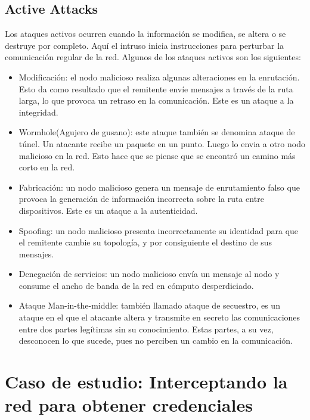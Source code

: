 \subsection{Active Attacks}
Los ataques activos ocurren cuando la información se modifica, se altera o 
se destruye por completo. Aquí el intruso inicia instrucciones para 
perturbar la comunicación regular de la red. Algunos de los ataques 
activos son los  siguientes:
\begin{itemize}
    \setlength\itemsep{-0.6em}
    \item Modificación: el nodo malicioso realiza algunas alteraciones en la 
    enrutación. Esto da como resultado que el remitente envíe mensajes a 
    través de la ruta larga, lo que provoca un retraso en la comunicación. 
    Este es un ataque a la integridad.
    \item Wormhole(Agujero de gusano): este ataque también se denomina ataque 
    de túnel. Un atacante recibe un paquete en un punto. Luego lo envia 
    a otro nodo malicioso en la red. Esto hace que se piense que se encontró 
    un camino más corto en la red.
    \item Fabricación: un nodo malicioso genera un mensaje de enrutamiento 
    falso que provoca la generación de información incorrecta sobre la ruta 
    entre dispositivos. Este es un ataque a la autenticidad.
    \item Spoofing: un nodo malicioso presenta incorrectamente su identidad 
    para que el remitente cambie su topología, y por consiguiente el 
    destino de sus mensajes.
    \item Denegación de servicios: un nodo malicioso envía un mensaje al 
    nodo y consume el ancho de banda de la red en cómputo desperdiciado.
    \item Ataque Man-in-the-middle: también llamado ataque de secuestro, 
    es un ataque en el que el atacante altera y transmite en secreto 
    las comunicaciones entre dos partes legítimas sin su conocimiento. 
    Estas partes, a su vez, desconocen lo que sucede, pues no perciben 
    un cambio en la comunicación.
\end{itemize}


\section{Caso de estudio: Interceptando la red para obtener credenciales}


